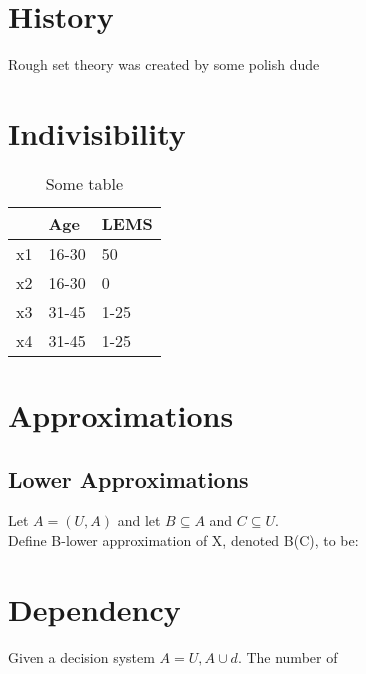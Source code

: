 \section{History}
Rough set theory was created by some polish dude

\section{Indivisibility}
\begin{table}
\centering
\begin{tabular}{|l | l | l |}
\toprule
 & Age & LEMS\\
 \midrule
x1 & 16-30 & 50\\
x2 & 16-30 &0\\
x3 & 31-45& 1-25\\
x4 & 31-45 & 1-25\\

\bottomrule
\end{tabular}
\caption{Some table}
\end{table}

\section{Approximations}

\subsection{Lower Approximations}
Let $A = (U, A)$ and let $B\subseteq A$ and $C \subseteq U $. \\
Define B-lower approximation of X, denoted B(C), to be:

\section{Dependency}
Given a decision system $A = {U, A \cup {d}}$. The number of 